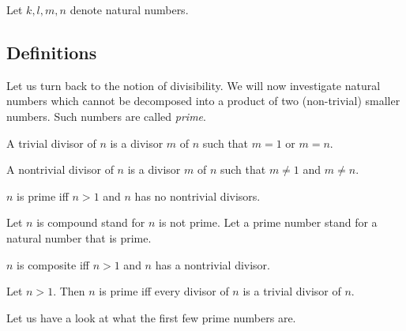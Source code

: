 \documentclass[../../arithmetic.ftl.tex]{subfiles}
\begin{document}
  \begin{forthel}
  \end{forthel}

  \begin{forthel}
    Let $k, l, m, n$ denote natural numbers.
  \end{forthel}


  \subsection{Definitions}

  Let us turn back to the notion of divisibility. We will now investigate
  natural numbers which cannot be decomposed into a product of two
  (non-trivial) smaller numbers. Such numbers are called \textit{prime}.

  \begin{forthel}
    \begin{definition}
      A trivial divisor of $n$ is a divisor $m$ of $n$ such that $m = 1$ or $m = n$.
    \end{definition}

    \begin{definition}
      A nontrivial divisor of $n$ is a divisor $m$ of $n$ such that $m \neq 1$ and $m \neq n$.
    \end{definition}

    \begin{definition}
      $n$ is prime iff $n > 1$ and $n$ has no nontrivial divisors.
    \end{definition}

    Let $n$ is compound stand for $n$ is not prime.
    Let a prime number stand for a natural number that is prime.

    \begin{definition}
      $n$ is composite iff $n > 1$ and $n$ has a nontrivial divisor.
    \end{definition}

    \begin{proposition}\label{Arithmetic_03_04_357744}
      Let $n > 1$.
      Then $n$ is prime iff every divisor of $n$ is a trivial divisor of $n$.
    \end{proposition}
  \end{forthel}

  \noindent Let us have a look at what the first few prime numbers are.
\end{document}
